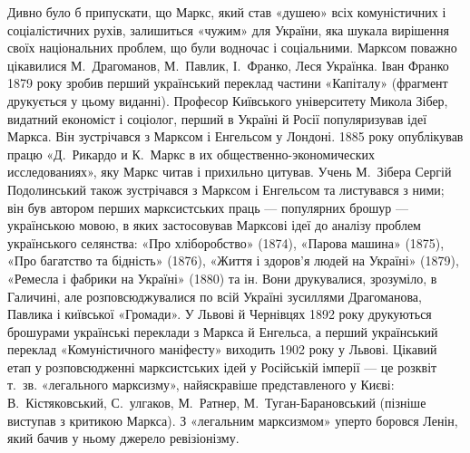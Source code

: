 Дивно було б припускати, що Маркс, який став «душею» всіх 
комуністичних і соціалістичних рухів, залишиться «чужим» для України, 
яка шукала вирішення своїх національних проблем, що були водночас і 
соціальними. Марксом поважно цікавилися М.~Драгоманов, М.~Павлик, І.~Франко,
Леся Українка. Іван Франко 1879 року зробив перший український 
переклад частини «Капіталу» (фрагмент друкується у цьому виданні). 
Професор Київського університету Микола Зібер, видатний економіст і 
соціолог, перший в Україні й Росії популяризував ідеї Маркса. Він 
зустрічався з Марксом і Енгельсом у Лондоні. 1885 року опублікував працю 
«Д.~Рикардо и К.~Маркс в их общественно-экономических исследованиях», 
яку Маркс читав і прихильно цитував. Учень М.~Зібера Сергій 
Подолинський також зустрічався з Марксом і Енгельсом та листувався з 
ними; він був автором перших марксистських праць — популярних брошур 
— українською мовою, в яких застосовував Марксові ідеї до аналізу 
проблем українського селянства: «Про хліборобство» (1874), «Парова 
машина» (1875), «Про багатство та бідність» (1876), «Життя і здоров'я людей 
на Україні» (1879), «Ремесла і фабрики на Україні» (1880) та ін. Вони 
друкувалися, зрозуміло, в Галичині, але розповсюджувалися по всій 
Україні зусиллями Драгоманова, Павлика і київської «Громади». У 
Львові й Чернівцях 1892 року друкуються брошурами українські переклади 
з Маркса й Енгельса, а перший український переклад «Комуністичного 
маніфесту» виходить 1902 року у Львові. Цікавий етап у розповсюдженні 
марксистських ідей у Російській імперії — це розквіт т.~зв. 
«легального марксизму», найяскравіше представленого у Києві: В.~Кістяковський,
 С.~улгаков, М.~Ратнер, М.~Туган-Барановський (пізніше 
виступав з критикою Маркса). З «легальним марксизмом» уперто боровся 
Ленін, який бачив у ньому джерело ревізіонізму.


